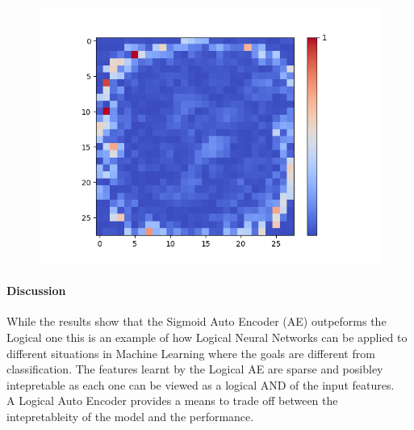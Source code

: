 \begin{figure}[H]
\begin{minipage}[b]{0.19\textwidth}
		\includegraphics[width=\textwidth]{SAE(20LF)/Feature-15.png}
		\label{}
	\end{minipage}
	
	\hfill
\end{figure}

\paragraph{Discussion}
While the results show that the Sigmoid Auto Encoder (AE) outpeforms the Logical one this is an example of how Logical Neural Networks can be applied to different situations in Machine Learning where the goals are different from classification. The features learnt by the Logical AE are sparse and posibley intepretable as each one can be viewed as a logical AND of the input features.\\

A Logical Auto Encoder provides a means to trade off between the intepretableity of the model and the performance.
